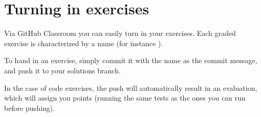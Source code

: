 
\section{Turning in exercises}\label{sec:handin_instructions}
Via GitHub Classroom you can easily turn in your exercises.
Each graded exercise is characterized by a name (for instance ).

To hand in an exercise, simply commit it with the name as the commit message, and push it to your solutions branch.

In the case of code exercises, the push will automatically result in an evaluation, which will assign you points (running the same tests as the ones you can run before pushing).


